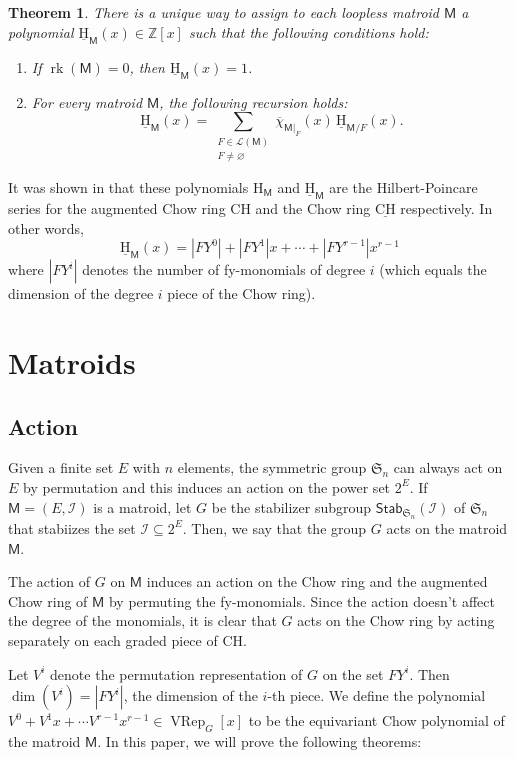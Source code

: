 \documentclass[10pt, a4paper, english]{amsart}
\theoremstyle{teoremas}
\newtheorem{theorem}{Theorem}[section]
\theoremstyle{definition}
\DeclareMathOperator{\rk}{rk}
\newcommand{\M}{\mathsf{M}}
\newcommand{\stab}{\mathsf{Stab}}
\newcommand{\cI}{\mathcal{I}}
\newcommand{\symm}{\mathfrak{S}}
\renewcommand{\H}{\mathrm{H}}
\newcommand{\CH}{\mathrm{CH}}
\newcommand{\uH}{\underline{\mathrm{H}}}
\newcommand{\uCH}{\underline{\mathrm{CH}}}
\newcommand{\VRep}{\operatorname{VRep}}
\begin{document}
\begin{theorem}\label{thm:fmsv-intro-main0}
    There is a unique way to assign to each loopless matroid $\M$  a polynomial $\uH_{\M}(x)\in \mathbb{Z}[x]$ such that the following conditions hold:
    \begin{enumerate}[\normalfont(i)]
        \item If $\rk(\M) = 0$, then $\uH_{\M}(x) = 1$.
        \item For every matroid $\M$, the following recursion holds:
            \[ \uH_{\M}(x) = \sum_{\substack{F\in\mathcal{L}(\M)\\ F\neq\varnothing}} \overline{\chi}_{\M|_F}(x)\, \uH_{\M/F}(x).\]
    \end{enumerate}
\end{theorem}

It was shown in \cite{fmsv24} that these polynomials $\H_\M$ and $\uH_\M$ are the Hilbert-Poincare series
for the augmented Chow ring $\CH$ and the Chow ring $\uCH$ respectively. In other words,
$$\uH_\M(x) = |FY^0| + |FY^1|x +\cdots + |FY^{r-1}|x^{r-1}$$
where $|FY^i|$ denotes the number of fy-monomials of degree $i$ (which equals the dimension of the degree $i$ piece of the Chow ring).

\section{Matroids}\label{sec:matroids}
\subsection{Action}
Given a finite set $E$ with $n$ elements, the symmetric group $\symm_n$ can always act on $E$ by permutation and this induces an
action on the power set $2^E$. If $\M = (E, \cI)$ is a matroid, let $G$ be the stabilizer subgroup $\stab_{\symm_n}(\cI)$ of $\symm_n$ that
stabiizes the set $\cI\subseteq 2^E$. Then, we say that the group $G$ acts on the matroid $\M$.

The action of $G$ on $\M$ induces an action on the Chow ring and the augmented Chow ring of $\M$ by permuting the fy-monomials. Since the action doesn't
affect the degree of the monomials, it is clear that $G$ acts on the Chow ring by acting separately on each graded piece of $\CH$.

Let $V^i$ denote the permutation representation of $G$ on the set $FY^i$. Then $\dim(V^i) = |FY^i|$, the dimension of the $i$-th piece.
We define the polynomial $V^0+V^1x+\cdots V^{r-1}x^{r-1}\in\VRep_G[x]$ to be the equivariant Chow polynomial of the matroid $\M$. In this paper,
we will prove the following theorems:
\end{document}
